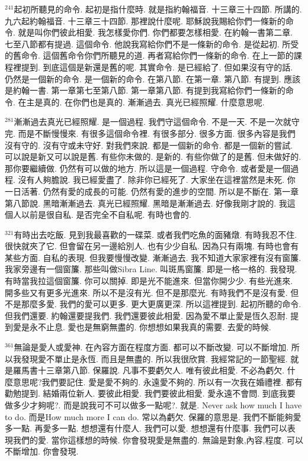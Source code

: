 \documentclass{book}
\begin{document}
$^{241}$起初所聽見的命令.
起初是指什麼時.
就是指約翰福音.
十三章三十四節.
所講的.
九六起約翰福音.
十三章三十四節.
那裡說什麼呢.
耶穌說我賜給你們一條新的命令.
就是叫你們彼此相愛.
我怎樣愛你們.
你們都要怎樣相愛.
在約翰一書第二章.
七至八節都有提過.
這個命令.
他說我寫給你們不是一條新的命令.
是從起初.
所受的舊命令.
這個舊命令你們所聽見的道.
再者寫給你們一條新的命令.
在上一節的課程裡提到.
到底這個是新還是舊的呢.
其實命令.
是已經給了.
但如果沒有守的話.
仍然是一個新的命令.
是一個新的命令.
在第八節.
在第一章.
第八節.
有提到.
應該是約翰一書.
第一章第七至第八節.
第一章第八節.
有提到我寫給你們一條新的命令.
在主是真的.
在你們也是真的.
漸漸過去.
真光已經照耀.
什麼意思呢.

$^{281}$漸漸過去真光已經照耀.
是一個過程.
我們守這個命令.
不是一天.
不是一次就守完.
而是不斷慢慢來.
有很多這個命令裡.
有很多部分.
很多方面.
很多內容是我們沒有守的.
沒有守或未守好.
對我們來說.
都是一個新的命令.
都是一個新的嘗試.
可以說是新又可以說是舊.
有些你未做的.
是新的.
有些你做了的是舊.
但未做好的.
那你要繼續做.
仍然有可以做的地方.
所以這是一個過程.
守命令.
或者愛是一個過程.
沒有人夠膽說.
我已經愛盡了.
除非你已經死了.
大家坐在這裡當然是未死.
你一日活著.
仍然有愛的成長的可能.
仍然有愛的進步的空間.
所以是不斷在.
第一章第八節說.
黑暗漸漸過去.
真光已經照耀.
黑暗是漸漸過去.
好像我剛才說的.
我這個人以前是很自私.
是否完全不自私呢.
有時也會的.

$^{321}$有時出去吃飯.
見到我最喜歡的一碟菜.
或者我們吃魚的面豬燉.
有時我忍不住.
很快就夾了它.
但會留在另一邊給別人.
也有少少自私.
因為只有兩塊.
有時也會有某些方面.
自私的表現.
但我要慢慢改變.
漸漸過去.
我不知道大家家裡有沒有窗簾.
我家旁邊有一個窗簾.
那些叫做Sibra Line.
叫斑馬窗簾.
即是一格一格的.
我發現.
有時當我拉這個窗簾.
你可以關掉.
即是光不能進來.
但當你開少少.
有些光進來.
開多些又有更多光進來.
所以不是沒有光.
但不是那麼光.
有時我們不是沒有愛.
但不是那麼多愛.
我們的愛可以更多.
更大更廣更深.
所以這裡提到.
起初所聽的命令.
但我們還要.
約翰還要提我們.
我們還要彼此相愛.
因為愛不單止愛是恆久忍耐.
提到愛是永不止息.
愛也是無窮無盡的.
你想想如果我真的需要.
去愛的時候.

$^{361}$無論是愛人或愛神.
在內容方面在程度方面.
都可以不斷改變.
可以不斷增加.
所以我發現愛不單止是永恆.
而且是無盡的.
所以我很欣賞.
我經常記的一節聖經.
就是羅馬書十三章第八節.
保羅說.
凡事不要虧欠人.
唯有彼此相愛.
不必為虧欠.
什麼意思呢?我們要記住.
愛是愛不夠的.
永遠愛不夠的.
所以有一次我在婚禮裡.
都有勸勉提到.
結婚兩位新人.
要彼此相愛.
我們要彼此相愛.
愛永遠不會問.
到底我要做多少才夠呢?.
而是說我可不可以做多一點呢?.
就是.
Never ask how much I have to do.
而是How much more I can do.
常以為虧欠.
保羅的意思是.
我們不斷能夠愛多一點.
再愛多一點.
想想還有什麼人.
我們可以愛.
想想還有什麼事.
我們可以表現我們的愛.
當你這樣想的時候.
你會發現愛是無盡的.
無論是對象,內容,程度.
可以不斷增加.
你會發現.
\end{document}
